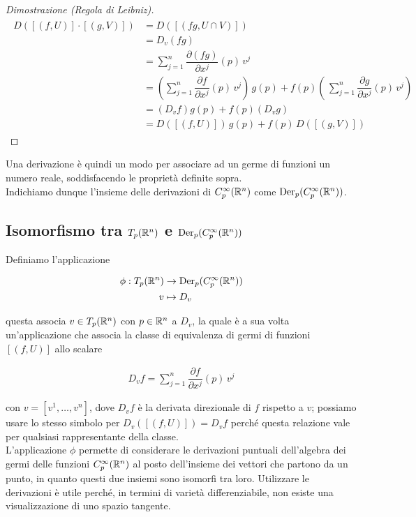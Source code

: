 \begin{proof}[Dimostrazione (Regola di Leibniz)]
	\begin{align}
		\begin{split}
			D ([(f,U)] \cdot [(g,V)]) &= D ([(f g,U \cap V)])\\
			&= D_{v} (f g)\\
			&= \sum_{j=1}^{n} \dfrac{\partial (f g)}{\partial x^{j}} (p) \, v^{j}\\
			&= \left( \sum_{j=1}^{n} \dfrac{\partial f}{\partial x^{j}} (p) \, v^{j} \right) \, g(p) + f(p) \left( \, \sum_{j=1}^{n} \dfrac{\partial g}{\partial x^{j}} (p) \, v^{j} \right)\\
			&= (D_{v} f) g(p) + f(p) (D_{v} g)\\
			&= D ([(f,U)]) \, g(p) + f(p) \, D ([(g,V)])
		\end{split}
	\end{align}
\end{proof}

Una derivazione è quindi un modo per associare ad un germe di funzioni un numero reale, soddisfacendo le proprietà definite sopra.\\
Indichiamo dunque l'insieme delle derivazioni di $ C_{p}^{\infty}(\mathbb{R}^{n}) $ come $ \operatorname{Der}_{p}(C_{p}^{\infty}(\mathbb{R}^{n})) $.

\subsection{Isomorfismo tra $ T_{p}(\mathbb{R}^{n}) $ e $ \operatorname{Der}_{p}(C_{p}^{\infty}(\mathbb{R}^{n})) $}

Definiamo l'applicazione

\begin{align}
	\begin{split}
		\phi : T_{p}(\mathbb{R}^{n}) &\to \operatorname{Der}_{p}(C_{p}^{\infty}(\mathbb{R}^{n}))\\
		v &\mapsto D_{v}
	\end{split}
\end{align}

questa associa $ v \in T_{p}(\mathbb{R}^{n}) $ con $ p \in \mathbb{R}^{n} $ a $ D_{v} $, la quale è a sua volta un'applicazione che associa la classe di equivalenza di germi di funzioni $ [(f,U)] $ allo scalare

\begin{align}
	D_{v} f = \sum_{j=1}^{n} \dfrac{\partial f}{\partial x^{j}} (p) \, v^{j}
\end{align}

con $ v = [v^{1},\dots,v^{n}] $, dove $ D_{v} f $ è la derivata direzionale di $ f $ rispetto a $ v $; possiamo usare lo stesso simbolo per $ D_{v} ([(f,U)]) = D_{v} f $ perché questa relazione vale per qualsiasi rappresentante della classe.\\
L'applicazione $ \phi $ permette di considerare le derivazioni puntuali dell'algebra dei germi delle funzioni $ C_{p}^{\infty}(\mathbb{R}^{n}) $ al posto dell'insieme dei vettori che partono da un punto, in quanto questi due insiemi sono isomorfi tra loro. Utilizzare le derivazioni è utile perché, in termini di varietà differenziabile, non esiste una visualizzazione di uno spazio tangente.


